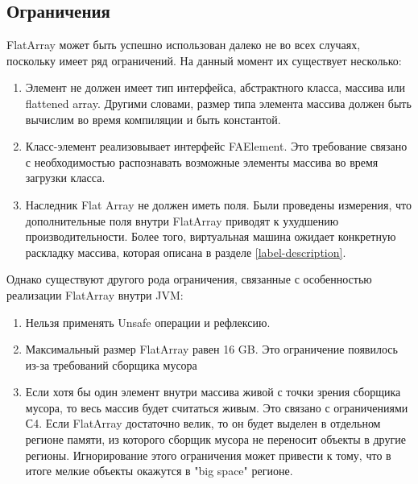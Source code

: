 \subsection{Ограничения} \label{limitation}
FlatArray может быть успешно использован далеко не во всех случаях, поскольку имеет ряд ограничений. На данный момент их существует несколько:
\begin{enumerate}
	\item Элемент не должен имеет тип интерфейса, абстрактного класса, массива или flattened array. Другими словами, размер типа элемента массива должен быть вычислим во время компиляции и быть константой.
	\item Класс-элемент реализовывает интерфейс FAElement. Это требование связано с необходимостью распознавать возможные элементы массива во время загрузки класса.
	\item Наследник Flat Array не должен иметь поля. Были проведены измерения, что дополнительные поля внутри FlatArray приводят к ухудшению производительности. Более того, виртуальная машина ожидает конкретную раскладку массива, которая описана в разделе \ref{label-description}.
\end{enumerate}
\par
Однако существуют другого рода ограничения, связанные с особенностью реализации FlatArray внутри JVM: 
\begin{enumerate}
	\item Нельзя применять Unsafe операции и рефлексию.
	\item Максимальный размер FlatArray равен 16 GB. Это ограничение появилось из-за требований сборщика мусора
	\item Если хотя бы один элемент внутри массива живой с точки зрения сборщика мусора, то весь массив будет считаться живым. Это связано с ограничениями С4. Если FlatArray достаточно велик, то он будет выделен в отдельном регионе памяти, из которого сборщик мусора не переносит объекты в другие регионы. Игнорирование этого ограничения может привести к тому, что в итоге мелкие объекты окажутся в "big space" регионе.
\end{enumerate}

